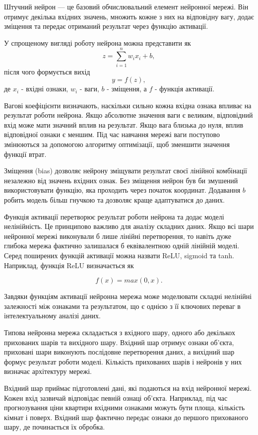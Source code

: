 Штучний нейрон — це базовий обчислювальний елемент нейронної мережі. Він отримує декілька вхідних значень, множить кожне з них на відповідну вагу, додає зміщення та передає отриманий результат через функцію активації.

У спрощеному вигляді роботу нейрона можна представити як $$z = \sum\limits_{i=1}^{n}w_{i}x_{i} + b,$$ після чого формується вихід $$y = f(z),$$ де $x_{i}$ - вхідні ознаки, $w_{i}$ - ваги, $b$ - зміщення, а $f$ - функція активації.

Вагові коефіцієнти визначають, наскільки сильно кожна вхідна ознака впливає на результат роботи нейрона. Якщо абсолютне значення ваги є великим, відповідний вхід може мати значний вплив на результат. Якщо вага близька до нуля, вплив відповідної ознаки є меншим. Під час навчання мережі ваги поступово змінюються за допомогою алгоритму оптимізації, щоб зменшити значення функції втрат.

Зміщення (bias) дозволяє нейрону зміщувати результат своєї лінійної комбінації незалежно від значень вхідних ознак. Без зміщення нейрон був би змушений використовувати функцію, яка проходить через початок координат. Додавання $b$ робить модель більш гнучкою та дозволяє краще адаптуватися до даних.

Функція активації перетворює результат роботи нейрона та додає моделі нелінійність. Це принципово важливо для аналізу складних даних. Якщо всі шари нейронної мережі виконували б лише лінійні перетворення, то навіть дуже глибока мережа фактично залишалася б еквівалентною одній лінійній моделі. Серед поширених функцій активації можна назвати ReLU, sigmoid та tanh. Наприклад, функція ReLU визначається як

$$f(x)=max(0,x).$$

Завдяки функціям активації нейронна мережа може моделювати складні нелінійні залежності між ознаками та результатом, що є однією з її ключових переваг в інтелектуальному аналізі даних.

Типова нейронна мережа складається з вхідного шару, одного або декількох прихованих шарів та вихідного шару. Вхідний шар отримує ознаки об'єкта, приховані шари виконують послідовне перетворення даних, а вихідний шар формує результат роботи моделі. Кількість прихованих шарів і нейронів у них визначає архітектуру мережі.

Вхідний шар приймає підготовлені дані, які подаються на вхід нейронної мережі. Кожен вхід зазвичай відповідає певній ознаці об'єкта. Наприклад, під час прогнозування ціни квартири вхідними ознаками можуть бути площа, кількість кімнат і поверх. Вхідний шар фактично передає ознаки до першого прихованого шару, де починається їх обробка.

